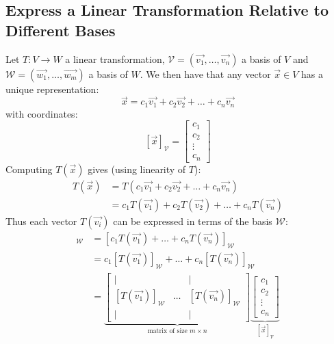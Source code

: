 \subsection{Express a Linear Transformation Relative to Different Bases}
\begin{eg}
    Let $T: V \to W$ a linear transformation, $\mathcal{V} = (\vec{v_1}, \ldots, \vec{v_n})$ a basis of $V$ and $\mathcal{W} = (\vec{w_1}, \ldots, \vec{w_m})$ a basis of $W$. We then have that any vector $\vec{x} \in V$ has a unique representation:
    \[ \vec{x} = c_1 \vec{v_1} + c_2 \vec{v_2} + \ldots + c_n \vec{v_n} \]
    with coordinates:
    \[ [\vec{x}]_{\mathcal{V}} = \begin{bmatrix}
        c_1 \\ c_2 \\ \vdots \\ c_n
    \end{bmatrix} \]
    Computing $T(\vec{x})$ gives (using linearity of $T$):
    \begin{align*}
        T(\vec{x}) &= T(c_1 \vec{v_1} + c_2 \vec{v_2} + \ldots + c_n \vec{v_n}) \\
        &= c_1 T(\vec{v_1}) + c_2 T(\vec{v_2}) + \ldots + c_n T(\vec{v_n})
    \end{align*}
    Thus each vector $T(\vec{v_i})$ can be expressed in terms of the basis $\mathcal{W}$:
    \begin{align*}
        [T(\vec{x})]_{\mathcal{W}} &= [c_1 T(\vec{v_1}) + \ldots + c_n T(\vec{v_n})]_{\mathcal{W}} \\
        &= c_1 [T(\vec{v_1})]_{\mathcal{W}} + \ldots + c_n [T(\vec{v_n})]_{\mathcal{W}} \\
        &= \underbrace{\begin{bmatrix}
            | & & | \\
            [T(\vec{v_1})]_{\mathcal{W}} & \ldots & [T(\vec{v_n})]_{\mathcal{W}} \\
            | & & |
        \end{bmatrix}}_{\text{matrix of size } m \times n} \underbrace{\begin{bmatrix}
            c_1 \\ c_2 \\ \vdots \\ c_n
        \end{bmatrix}}_{[\vec{x}]_{\mathcal{V}}}
    \end{align*}
\end{eg}

